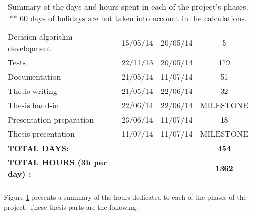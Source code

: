 \begin{table}[H]
\begin{tabular} {l c c c }
\hspace*{0.5cm}	Decision algorithm development	&	15/05/14	&	20/05/14	&	5	\\
\hspace*{0.5cm}	Tests	&	22/11/13	&	20/05/14	&	179\\	
Documentation	&	21/05/14	&	11/07/14	&	51	\\
\hspace*{0.5cm}		Thesis writing	&	21/05/14	&	22/06/14	&	32	\\
\hspace*{0.5cm}		Thesis hand-in	&	22/06/14	&	22/06/14	&	MILESTONE	\\
\hspace*{0.5cm}		Presentation preparation		&	23/06/14	&	11/07/14	&	18	\\
\hspace*{0.5cm}		Thesis presentation		&	11/07/14	&	11/07/14	&	MILESTONE	\\

\addlinespace[3mm]
\bottomrule
\addlinespace[3mm]

\textbf{TOTAL DAYS: 	}		&&&\textbf{	454}	\\
\textbf{TOTAL HOURS (3h per day) :} &&&			\textbf{1362}	\\
\addlinespace[3mm]

\bottomrule
\end{tabular}
\caption[Days and hours per project phase]{Summary of the days and hours spent in each of the project's phases.\\
** 60 days of holidays are not taken into account in the calculations.}	

\label{phases}

\end{table}
\vspace*{0.5cm}


	Figure \ref{phases} presents a summary of the hours dedicated to each of the phases of the project. 
	These thesis parts are the following: 

